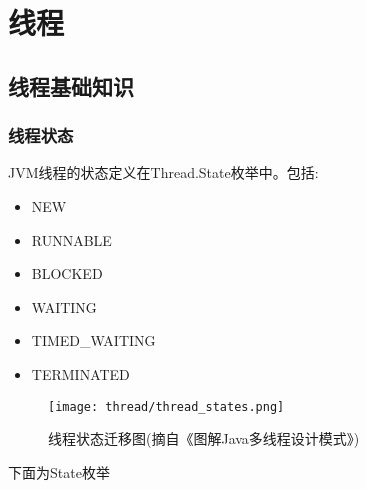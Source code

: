 \chapter{线程}

\section{线程基础知识}

\subsection{线程状态}

JVM线程的状态定义在Thread.State枚举中。包括:

\begin{itemize}
    \item   NEW 
    \item   RUNNABLE 
    \item   BLOCKED 
    \item   WAITING 
    \item   TIMED\_WAITING
    \item   TERMINATED
\end{itemize}


\begin{figure}[H]
    \centering
    \texttt{[image: thread/thread\_states.png]}
    \caption{线程状态迁移图(摘自《图解Java多线程设计模式》)}
\end{figure}

下面为State枚举


